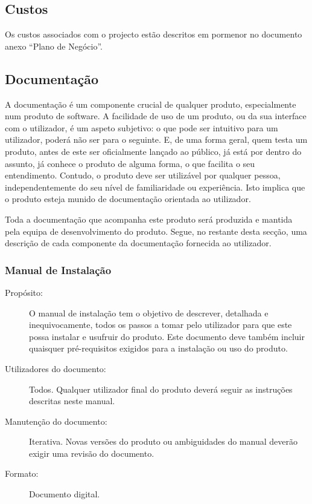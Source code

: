 \documentclass[12pt,a4paper]{article}
\begin{document}
 \subsection{Custos}
    Os custos associados com o projecto estão descritos em pormenor no documento anexo ``Plano de Negócio''.

  \subsection{Documentação}
    A documentação é um componente crucial de qualquer produto, especialmente num produto de software. A facilidade de uso de um produto, ou da sua interface com o utilizador, é um aspeto subjetivo: o que pode ser intuitivo para um utilizador, poderá não ser para o seguinte. E, de uma forma geral, quem testa um produto, antes de este ser oficialmente lançado ao público, já está por dentro do assunto, já conhece o produto de alguma forma, o que facilita o seu entendimento. Contudo, o produto deve ser utilizável por qualquer pessoa, independentemente do seu nível de familiaridade ou experiência. Isto implica que o produto esteja munido de documentação orientada ao utilizador.

    Toda a documentação que acompanha este produto será produzida e mantida pela equipa de desenvolvimento do produto. Segue, no restante desta secção, uma descrição de cada componente da documentação fornecida ao utilizador.

    \subsubsection{Manual de Instalação}
      \begin{description}
        \item[Propósito:]O manual de instalação tem o objetivo de descrever, detalhada e inequivocamente, todos os passos a tomar pelo utilizador para que este possa instalar e usufruir do produto. Este documento deve também incluir quaisquer pré-requisitos exigidos para a instalação ou uso do produto.
        \item[Utilizadores do documento:]Todos. Qualquer utilizador final do produto deverá seguir as instruções descritas neste manual.

        \item[Manutenção do documento:]Iterativa. Novas versões do produto ou ambiguidades do manual deverão exigir uma revisão do documento.
        \item[Formato:]Documento digital.
      \end{description}
\end{document}
